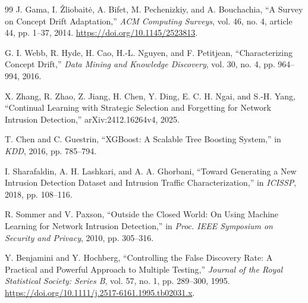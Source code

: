 \documentclass[runningheads]{llncs}
\begin{document}
\begin{thebibliography}{99}
J. Gama, I. \v{Z}liobait\.{e}, A. Bifet, M. Pechenizkiy, and A. Bouchachia, ``A Survey on Concept Drift Adaptation,'' \textit{ACM Computing Surveys}, vol. 46, no. 4, article 44, pp. 1--37, 2014. \url{https://doi.org/10.1145/2523813}.

G. I. Webb, R. Hyde, H. Cao, H.-L. Nguyen, and F. Petitjean,
``Characterizing Concept Drift,''
\textit{Data Mining and Knowledge Discovery}, vol. 30, no. 4,
pp. 964--994, 2016.

X. Zhang, R. Zhao, Z. Jiang, H. Chen, Y. Ding, E. C. H. Ngai, and S.-H. Yang, ``Continual Learning with Strategic Selection and Forgetting for Network Intrusion Detection,'' arXiv:2412.16264v4, 2025.

T. Chen and C. Guestrin, ``XGBoost: A Scalable Tree Boosting System,'' in \textit{KDD}, 2016, pp. 785--794.

I. Sharafaldin, A. H. Lashkari, and A. A. Ghorbani, ``Toward Generating a New Intrusion Detection Dataset and Intrusion Traffic Characterization,'' in \textit{ICISSP}, 2018, pp. 108--116.

R. Sommer and V. Paxson,
``Outside the Closed World: On Using Machine Learning for Network Intrusion Detection,''
in \textit{Proc. IEEE Symposium on Security and Privacy}, 2010, pp. 305--316.

Y. Benjamini and Y. Hochberg, ``Controlling the False Discovery Rate: A Practical and Powerful Approach to Multiple Testing,'' \textit{Journal of the Royal Statistical Society: Series B}, vol. 57, no. 1, pp. 289--300, 1995. \url{https://doi.org/10.1111/j.2517-6161.1995.tb02031.x}.

\end{thebibliography}
\end{document}
